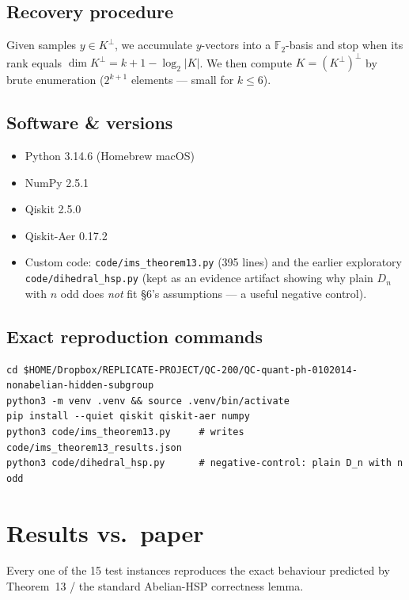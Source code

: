 \documentclass[11pt]{article}
\begin{document}
\subsection{Recovery procedure}
Given samples $y\in K^\perp$, we accumulate $y$-vectors into a
$\mathbb{F}_2$-basis and stop when its rank equals $\dim K^\perp = k{+}1-\log_2|K|$.
We then compute $K = (K^\perp)^\perp$ by brute enumeration
($2^{k+1}$ elements — small for $k\le 6$).

\subsection{Software \& versions}
\begin{itemize}
  \item Python 3.14.6 (Homebrew macOS)
  \item NumPy 2.5.1
  \item Qiskit 2.5.0
  \item Qiskit-Aer 0.17.2
  \item Custom code: \verb|code/ims_theorem13.py| (395 lines) and the earlier
        exploratory \verb|code/dihedral_hsp.py| (kept as an evidence artifact
        showing why plain $D_n$ with $n$ odd does \emph{not} fit \S6's
        assumptions — a useful negative control).
\end{itemize}

\subsection{Exact reproduction commands}
\begin{lstlisting}[basicstyle=\ttfamily\small,breaklines=true]
cd $HOME/Dropbox/REPLICATE-PROJECT/QC-200/QC-quant-ph-0102014-nonabelian-hidden-subgroup
python3 -m venv .venv && source .venv/bin/activate
pip install --quiet qiskit qiskit-aer numpy
python3 code/ims_theorem13.py     # writes code/ims_theorem13_results.json
python3 code/dihedral_hsp.py      # negative-control: plain D_n with n odd
\end{lstlisting}

\section{Results vs.\ paper}
Every one of the 15 test instances reproduces the exact behaviour
predicted by Theorem~13 / the standard Abelian-HSP correctness lemma.
\end{document}

